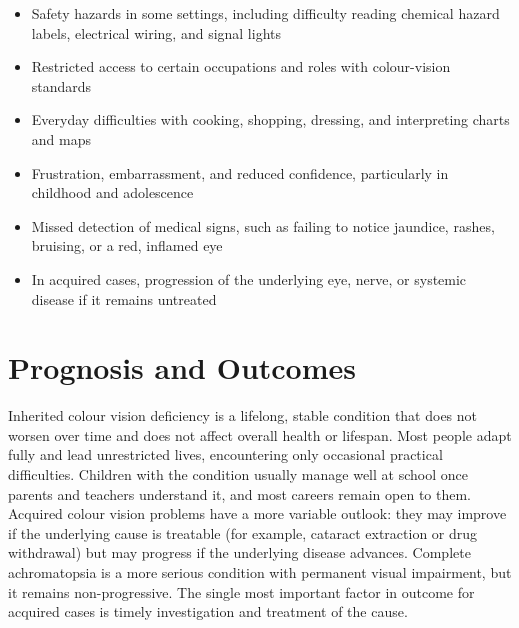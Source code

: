 \begin{itemize}
    \item Safety hazards in some settings, including difficulty reading chemical hazard labels, electrical wiring, and signal lights
    \item Restricted access to certain occupations and roles with colour-vision standards
    \item Everyday difficulties with cooking, shopping, dressing, and interpreting charts and maps
    \item Frustration, embarrassment, and reduced confidence, particularly in childhood and adolescence
    \item Missed detection of medical signs, such as failing to notice jaundice, rashes, bruising, or a red, inflamed eye
    \item In acquired cases, progression of the underlying eye, nerve, or systemic disease if it remains untreated
\end{itemize}

\section*{Prognosis and Outcomes}
Inherited colour vision deficiency is a lifelong, stable condition that does not worsen over time and does not affect overall health or lifespan. Most people adapt fully and lead unrestricted lives, encountering only occasional practical difficulties. Children with the condition usually manage well at school once parents and teachers understand it, and most careers remain open to them. Acquired colour vision problems have a more variable outlook: they may improve if the underlying cause is treatable (for example, cataract extraction or drug withdrawal) but may progress if the underlying disease advances. Complete achromatopsia is a more serious condition with permanent visual impairment, but it remains non-progressive. The single most important factor in outcome for acquired cases is timely investigation and treatment of the cause.

